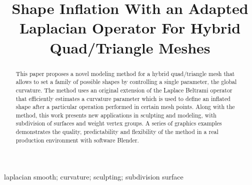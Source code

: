 \documentclass[10pt, conference]{IEEEtran}
\begin{document}
\title{Shape Inflation With an Adapted Laplacian Operator For Hybrid Quad/Triangle Meshes}

\newif\iffinal
\finaltrue
\newcommand{\jemsid}{114677}

\iffinal
  \author{%
  }
\else
  \author{Sibgrapi paper ID: \jemsid \\ }
\fi


\maketitle

\begin{abstract}
This paper proposes a novel modeling method for a hybrid quad/triangle
mesh that allows to set a family of possible shapes by controlling
a single parameter, the global curvature. The method uses an original
extension of the Laplace Beltrami operator that efficiently estimates
a curvature parameter which is used to define an inflated shape after
a particular operation performed in certain mesh points. Along with
the method, this work presents new applications in sculpting and modeling,
with subdivision of surfaces and weight vertex groups. A series of
graphics examples demonstrates the quality, predictability and flexibility
of the method in a real production environment with software Blender.

\end{abstract}

\begin{IEEEkeywords}
laplacian smooth; curvature; sculpting; subdivision surface

\end{IEEEkeywords}
\end{document}
